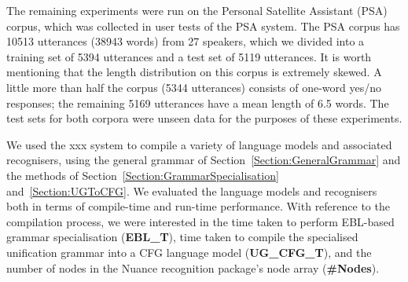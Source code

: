 \documentclass[11pt]{article}
\begin{document}


The remaining experiments were run on the Personal Satellite Assistant
(PSA) corpus, which was collected in user tests of the PSA system. The
PSA corpus has 10513 utterances (38943 words) from 27 speakers, which
we divided into a training set of 5394 utterances and a test set of
5119 utterances. It is worth mentioning that the length distribution
on this corpus is extremely skewed. A little more than half the corpus
(5344 utterances) consists of one-word yes/no responses; the remaining
5169 utterances have a mean length of 6.5 words. The test sets for
both corpora were unseen data for the purposes of these experiments.

We used the {\sc xxx} system to compile a variety of language models
and associated recognisers, using the general grammar of
Section~\ref{Section:GeneralGrammar} and the methods of
Section~\ref{Section:GrammarSpecialisation} and~\ref{Section:UGToCFG}.
We evaluated the language models and recognisers both in terms
of compile-time and run-time performance. With reference to the compilation
process, we were interested in the time taken to perform EBL-based
grammar specialisation ({\bf EBL\_T}), time taken to compile the
specialised unification grammar into a CFG language model ({\bf UG\_CFG\_T}),
and the number of nodes in the Nuance recognition package's node array
({\bf \#Nodes}). 
\end{document}
